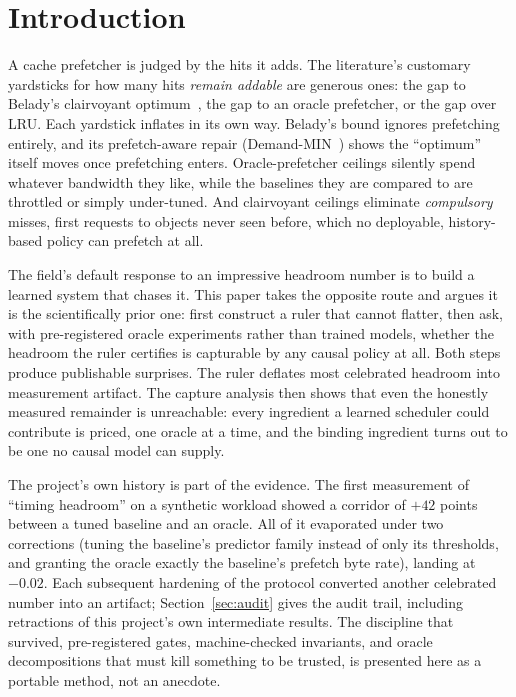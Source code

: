 \documentclass[11pt]{article}
\begin{document}
\section{Introduction}
A cache prefetcher is judged by the hits it adds. The literature's customary yardsticks for how many hits \emph{remain addable} are generous ones: the gap to Belady's clairvoyant optimum~\cite{belady}, the gap to an oracle prefetcher, or the gap over LRU. Each yardstick inflates in its own way. Belady's bound ignores prefetching entirely, and its prefetch-aware repair (Demand-MIN~\cite{demandmin}) shows the ``optimum'' itself moves once prefetching enters. Oracle-prefetcher ceilings silently spend whatever bandwidth they like, while the baselines they are compared to are throttled or simply under-tuned. And clairvoyant ceilings eliminate \emph{compulsory} misses, first requests to objects never seen before, which no deployable, history-based policy can prefetch at all.

The field's default response to an impressive headroom number is to build a learned system that chases it. This paper takes the opposite route and argues it is the scientifically prior one: first construct a ruler that cannot flatter, then ask, with pre-registered oracle experiments rather than trained models, whether the headroom the ruler certifies is capturable by any causal policy at all. Both steps produce publishable surprises. The ruler deflates most celebrated headroom into measurement artifact. The capture analysis then shows that even the honestly measured remainder is unreachable: every ingredient a learned scheduler could contribute is priced, one oracle at a time, and the binding ingredient turns out to be one no causal model can supply.

The project's own history is part of the evidence. The first measurement of ``timing headroom'' on a synthetic workload showed a corridor of $+42$ points between a tuned baseline and an oracle. All of it evaporated under two corrections (tuning the baseline's predictor family instead of only its thresholds, and granting the oracle exactly the baseline's prefetch byte rate), landing at $-0.02$. Each subsequent hardening of the protocol converted another celebrated number into an artifact; Section~\ref{sec:audit} gives the audit trail, including retractions of this project's own intermediate results. The discipline that survived, pre-registered gates, machine-checked invariants, and oracle decompositions that must kill something to be trusted, is presented here as a portable method, not an anecdote.
\end{document}
